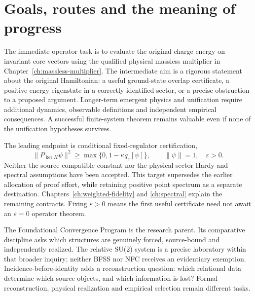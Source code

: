 
\section{Goals, routes and the meaning of progress}
\label{sec:ed08-goals}
The immediate operator task is to evaluate the original charge energy
on invariant core vectors using the qualified physical massless
multiplier in Chapter~\ref{ch:massless-multiplier}. The intermediate aim is a
rigorous statement about the original Hamiltonian: a useful
ground-state overlap certificate, a positive-energy eigenstate in
a correctly identified sector, or a precise obstruction to a proposed
argument. Longer-term emergent physics and unification require
additional dynamics, observable definitions and independent empirical
consequences. A successful finite-system theorem remains valuable
even if none of the unification hypotheses survives.

The leading endpoint is conditional fixed-regulator certification,
\begin{equation}\label{eq:ed08-certificate}
 \|P_{\ker H}\psi\|^2\geq
 \max\{0,1-\kappa q_\varepsilon[\psi]\},\qquad\|\psi\|=1,
 \quad\varepsilon>0.
\end{equation}
Neither the source-compatible constant nor the physical-sector Hardy
and spectral assumptions have been accepted. This target supersedes
the earlier allocation of proof effort, while retaining positive
point spectrum as a separate destination. Chapters~\ref{ch:weighted-fidelity} and \ref{ch:spectral} explain
the remaining contracts. Fixing $\varepsilon>0$ means the first useful
certificate need not await an $\varepsilon=0$ operator theorem.

The Foundational Convergence Program is the research parent. Its
comparative discipline asks which structures are genuinely forced,
source-bound and independently realized. The relative SU(2) system
is a precise laboratory within that broader inquiry; neither BFSS
nor NFC receives an evidentiary exemption. Incidence-before-identity
adds a reconstruction question: which relational data determine
which source objects, and which information is lost? Formal
reconstruction, physical realization and empirical selection remain
different tasks.

